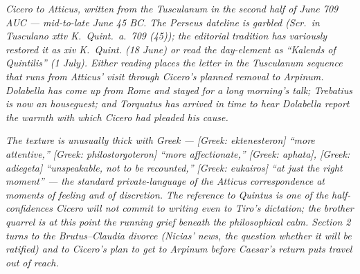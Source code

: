 
\textit{Cicero to Atticus, written from the Tusculanum
in the second half of June 709 AUC --- mid-to-late
June 45 BC. The Perseus dateline is garbled
(\textit{Scr.\ in Tusculano xttv K.\ Quint.\ a.\ 709
(45)}); the editorial tradition has variously
restored it as \textit{xiv K.\ Quint.} (18 June) or
read the day-element as ``Kalends of Quintilis'' (1
July). Either reading places the letter in the
Tusculanum sequence that runs from Atticus' visit
through Cicero's planned removal to Arpinum.
Dolabella has come up from Rome and stayed for a
long morning's talk; Trebatius is now an
houseguest; and Torquatus has arrived in time to
hear Dolabella report the warmth with which Cicero
had pleaded his cause.}

\textit{The texture is unusually thick with Greek ---
\textit{[Greek: ektenesteron]} ``more attentive,''
\textit{[Greek: philostorgoteron]} ``more
affectionate,'' \textit{[Greek: aphata]}, \textit{[Greek:
adiegeta]} ``unspeakable, not to be recounted,''
\textit{[Greek: eukairos]} ``at just the right
moment'' --- the standard private-language of the
Atticus correspondence at moments of feeling and of
discretion. The reference to Quintus is one of the
half-confidences Cicero will not commit to writing
even to Tiro's dictation; the brother quarrel is at
this point the running grief beneath the philosophical
calm. Section 2 turns to the Brutus--Claudia divorce
(Nicias' news, the question whether it will be ratified)
and to Cicero's plan to get to Arpinum before
Caesar's return puts travel out of reach.}
